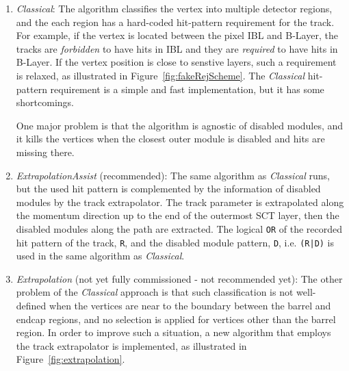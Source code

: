 \begin{enumerate}
\item \emph{Classical}: The algorithm classifies the vertex into multiple detector regions, and the each region has a hard-coded hit-pattern requirement for the track. For example, if the vertex is located between the pixel IBL and B-Layer, the tracks are \emph{forbidden} to have hits in IBL and they are \emph{required} to have hits in B-Layer. If the vertex position is close to senstive layers, such a requirement is relaxed, as illustrated in Figure~\ref{fig:fakeRejScheme}. The \emph{Classical} hit-pattern requirement is a simple and fast implementation, but it has some shortcomings.

One major problem is that the algorithm is agnostic of disabled modules, and it kills the vertices when the closest outer module is disabled and hits are missing there.

\item \emph{ExtrapolationAssist} (recommended): The same algorithm as \emph{Classical} runs, but the used hit pattern is complemented by the information of disabled modules by the track extrapolator. The track parameter is extrapolated along the momentum direction up to the end of the outermost SCT layer, then the disabled modules along the path are extracted. The logical {\tt OR} of the recorded hit pattern of the track, {\tt R}, and the disabled module pattern, {\tt D}, i.e. {\tt (R|D)} is used in the same algorithm as \emph{Classical}.

\item \emph{Extrapolation} (not yet fully commissioned - not recommended yet):  The other problem of the \emph{Classical} approach is that such classification is not well-defined when the vertices are near to the boundary between the barrel and endcap regions, and no selection is applied for vertices other than the barrel region. In order to improve such a situation, a new algorithm that employs the track extrapolator is implemented, as illustrated in Figure~\ref{fig:extrapolation}. 


\end{enumerate}
